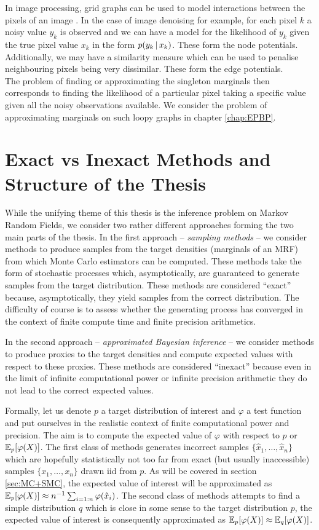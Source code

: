 In image processing, grid graphs can be used to model interactions between the pixels of an image  \citep{blake11}. 
In the case of image denoising for example, for each pixel $k$ a noisy value $y_k$ is observed and we can have a model for the likelihood of $y_k$ given the true pixel value $x_k$ in the form $p(y_k\,|\, x_k)$. These  form the node potentials. 
Additionally, we may have a similarity measure which can be used to penalise neighbouring pixels being very dissimilar. These form the edge potentials.\\
The problem of finding or approximating the singleton marginals then corresponds to finding the likelihood of a particular pixel taking a specific value given all the noisy observations available. We consider the problem of approximating marginals on such loopy graphs in chapter \ref{chap:EPBP}. 

\section{Exact vs Inexact Methods and Structure of the Thesis}

While the unifying theme of this thesis is the inference problem on Markov Random Fields, we consider two rather different approaches forming the two main parts of the thesis. In the first approach -- \emph{sampling methods} -- we consider methods to produce samples from the target densities (marginals of an MRF) from which Monte Carlo estimators can be computed. These methods take the form of stochastic processes which, asymptotically, are guaranteed to generate samples from the target distribution. These methods are considered ``exact'' because, asymptotically, they yield samples from the correct distribution. The difficulty of course is to assess whether the generating process has converged in the context of finite compute time and finite precision arithmetics. 

In the second approach -- \emph{approximated Bayesian inference} -- we consider methods to produce proxies to the target densities and compute expected values with respect to these proxies. These methods are considered ``inexact'' because even in the limit of infinite computational power or infinite precision arithmetic they do not lead to the correct expected values. 

Formally, let us denote $p$ a target distribution of interest and $\varphi$ a test function and put ourselves in the realistic context of finite computational power and precision. The aim is to compute the expected value of $\varphi$ with respect to $p$ or $\mathbb E_{p}[\varphi(X)]$. The first class of methods generates incorrect samples $\{\hat x_{1},\dots,\hat x_{n}\}$ which are hopefully statistically not too far from exact (but usually inaccessible) samples $\{x_{1},\dots,x_{n}\}$ drawn iid from $p$. 
As will be covered in section \ref{sec:MC+SMC}, the expected value of interest will be approximated as $\mathbb E_{p}[\varphi(X)]\approx n^{-1} \sum_{i=1:n}\varphi(\hat x_{i})$. The second class of methods attempts to find a simple distribution $q$ which is close in some sense to the target distribution $p$, the expected value of interest is consequently approximated as $\mathbb E_{p}[\varphi(X)]\approx \mathbb E_{q}[\varphi(X)]$. 

